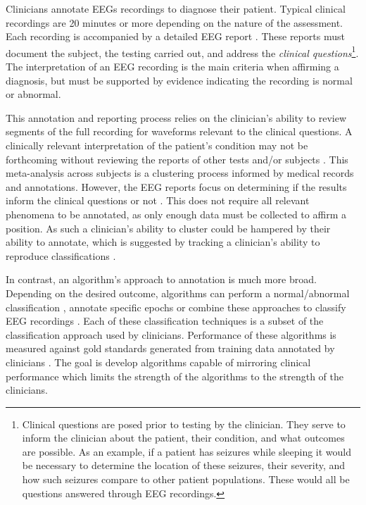 Clinicians annotate \acp{EEG} recordings to diagnose their patient. Typical clinical recordings are 20 minutes or more depending on the nature of the assessment. Each recording is accompanied by a detailed \ac{EEG} report \cite{Epstein2006}. These reports must document the subject, the testing carried out, and address the \textit{clinical questions}\footnote{Clinical questions are posed prior to testing by the clinician. They serve to inform the clinician about the patient, their condition, and what outcomes are possible. As an example, if a patient has seizures while sleeping it would be necessary to determine the location of these seizures, their severity, and how such seizures compare to other patient populations. These would all be questions answered through \ac{EEG} recordings.}. The interpretation of an \ac{EEG} recording is the main criteria when affirming a diagnosis, but must be supported by evidence indicating the recording is normal or abnormal\cite{Kaplan2013}.

This annotation and reporting process relies on the clinician's ability to review segments of the full recording for waveforms relevant to the clinical questions. A clinically relevant interpretation of the patient's condition may not be forthcoming without reviewing the reports of other tests and/or subjects \cite{Epstein2006}. This meta-analysis across subjects is a clustering process informed by medical records and annotations. However, the \ac{EEG} reports focus on determining if the results inform the clinical questions or not \cite{Kaplan2013}. This does not require all relevant phenomena to be annotated, as only enough data must be collected to affirm a position. As such a clinician's ability to cluster could be hampered by their ability to annotate, which is suggested by tracking a clinician's ability to reproduce classifications \cite{Halford2017}.

In contrast, an algorithm's approach to annotation is much more broad. Depending on the desired outcome, algorithms can perform a normal/abnormal classification \cite{Lopez2015}, annotate specific epochs \cite{Wulsin2011} or combine these approaches to classify \ac{EEG} recordings \cite{Schluter2012}. Each of these classification techniques is a subset of the classification approach used by clinicians. Performance of these algorithms is measured against gold standards generated from training data annotated by clinicians \cite{Wulsin2011,Warby2014}. The goal is develop algorithms capable of mirroring clinical performance which limits the strength of the algorithms to the strength of the clinicians.

